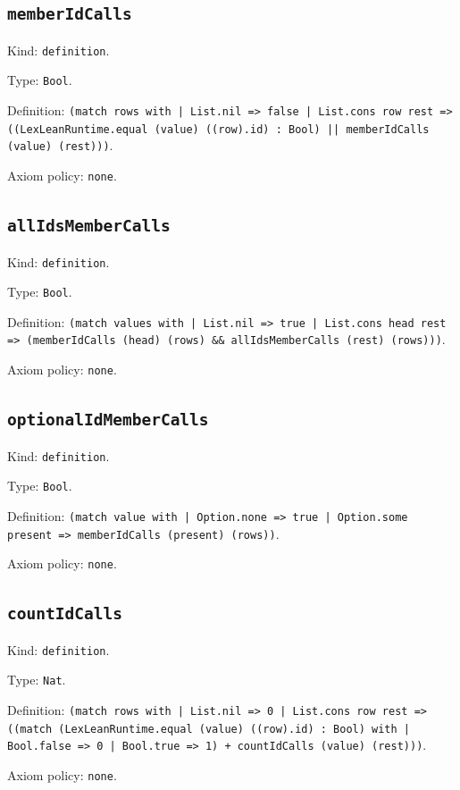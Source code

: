 \documentclass[11pt]{article}
\begin{document}
\subsection*{\texttt{memberIdCalls}}
\noindent Kind: \texttt{definition}.\par
\noindent Type: \texttt{Bool}.\par
\noindent Definition: \texttt{(match rows with | List.nil => false | List.cons row rest => ((LexLeanRuntime.equal (value) ((row).id) : Bool) || memberIdCalls (value) (rest)))}.\par
\noindent Axiom policy: \texttt{none}.\par
\subsection*{\texttt{allIdsMemberCalls}}
\noindent Kind: \texttt{definition}.\par
\noindent Type: \texttt{Bool}.\par
\noindent Definition: \texttt{(match values with | List.nil => true | List.cons head rest => (memberIdCalls (head) (rows) \&\& allIdsMemberCalls (rest) (rows)))}.\par
\noindent Axiom policy: \texttt{none}.\par
\subsection*{\texttt{optionalIdMemberCalls}}
\noindent Kind: \texttt{definition}.\par
\noindent Type: \texttt{Bool}.\par
\noindent Definition: \texttt{(match value with | Option.none => true | Option.some present => memberIdCalls (present) (rows))}.\par
\noindent Axiom policy: \texttt{none}.\par
\subsection*{\texttt{countIdCalls}}
\noindent Kind: \texttt{definition}.\par
\noindent Type: \texttt{Nat}.\par
\noindent Definition: \texttt{(match rows with | List.nil => 0 | List.cons row rest => ((match (LexLeanRuntime.equal (value) ((row).id) : Bool) with | Bool.false => 0 | Bool.true => 1) + countIdCalls (value) (rest)))}.\par
\noindent Axiom policy: \texttt{none}.\par
\end{document}
